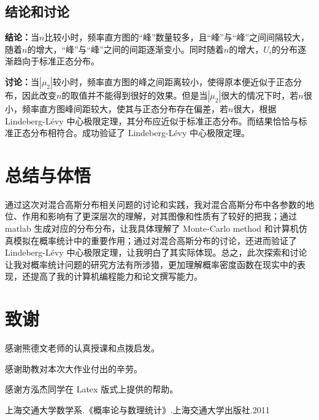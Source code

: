 \documentclass[CJK]{ctexart}
\begin{document}
\subsection{结论和讨论}

\textbf{结论：}当$n$比较小时，频率直方图的“峰”数量较多，且“峰”与“峰”之间间隔较大，随着$n$的增大，“峰”与“峰”之间的间距逐渐变小。同时随着$n$的增大，$U_i$的分布逐渐趋向于标准正态分布。

\textbf{讨论：}当$|\mu_2|$较小时，频率直方图的峰之间距离较小，使得原本便近似于正态分布，因此改变$n$的取值并不能得到很好的效果。但是当$|\mu_2|$很大的情况下时，若$n$很小，频率直方图峰间距较大，使其与正态分布存在偏差，若$n$很大，根据 Lindeberg-L\'{e}vy 中心极限定理，其分布应近似于标准正态分布。而结果恰恰与标准正态分布相符合。成功验证了 Lindeberg-L\'{e}vy 中心极限定理。

\section{总结与体悟}

通过这次对混合高斯分布相关问题的讨论和实践，我对混合高斯分布中各参数的地位、作用和影响有了更深层次的理解，对其图像和性质有了较好的把我；通过 matlab 生成对应的分布分布，让我具体理解了 Monte-Carlo method 和计算机仿真模拟在概率统计中的重要作用；通过对混合高斯分布的讨论，还进而验证了 Lindeberg-L\'{e}vy 中心极限定理，让我明白了其实际体现。总之，此次探索和讨论让我对概率统计问题的研究方法有所涉猎，更加理解概率密度函数在现实中的表现，还提高了我的计算机编程能力和论文撰写能力。

\section{致谢}

感谢熊德文老师的认真授课和点拨启发。

感谢助教对本次大作业付出的辛劳。

感谢方泓杰同学在 Latex 版式上提供的帮助。

\begin{thebibliography}{1}
上海交通大学数学系.《概率论与数理统计》.上海交通大学出版社.2011
\end{thebibliography}
\end{document}

